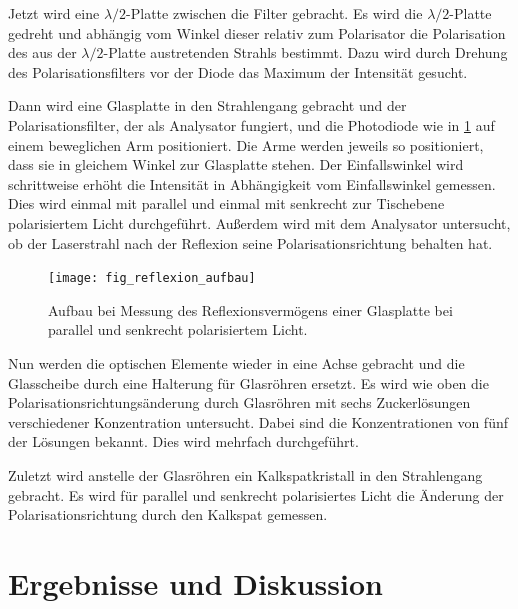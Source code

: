 \documentclass[
	a4paper,
	12pt,
	pagesize,
	ngerman
]{scrartcl}
\begin{document}
	Jetzt wird eine $\lambda /2$-Platte zwischen die Filter gebracht.
	Es wird die $\lambda /2$-Platte gedreht und abhängig vom Winkel dieser relativ zum Polarisator die Polarisation des aus der $\lambda /2$-Platte austretenden Strahls bestimmt.
	Dazu wird durch Drehung des Polarisationsfilters vor der Diode das Maximum der Intensität gesucht.
	
	Dann wird eine Glasplatte in den Strahlengang gebracht und der Polarisationsfilter, der als Analysator fungiert, und die Photodiode wie in \cref{fig_reflexion_aufbau} auf einem beweglichen Arm positioniert.
	Die Arme werden jeweils so positioniert, dass sie in gleichem Winkel zur Glasplatte stehen.
	Der Einfallswinkel wird schrittweise erhöht die Intensität in Abhängigkeit vom Einfallswinkel gemessen.
	Dies wird einmal mit parallel und einmal mit senkrecht zur Tischebene polarisiertem Licht durchgeführt.
	Außerdem wird mit dem Analysator untersucht, ob der Laserstrahl nach der Reflexion seine Polarisationsrichtung behalten hat.
	
	\begin{figure}[H] 
		\texttt{[image: fig\_reflexion\_aufbau]}
		\centering
		\caption{Aufbau bei Messung des Reflexionsvermögens einer Glasplatte bei parallel und senkrecht polarisiertem Licht. \cite{aufbau_reflexion}} 
		\label{fig_reflexion_aufbau}
		\centering
	\end{figure}
	
	Nun werden die optischen Elemente wieder in eine Achse gebracht und die Glasscheibe durch eine Halterung für Glasröhren ersetzt.
	Es wird wie oben die Polarisationsrichtungsänderung durch Glasröhren mit sechs Zuckerlösungen verschiedener Konzentration untersucht.
	Dabei sind die Konzentrationen von fünf der Lösungen bekannt.
	Dies wird mehrfach durchgeführt.
	
	Zuletzt wird anstelle der Glasröhren ein Kalkspatkristall in den Strahlengang gebracht.
	Es wird für parallel und senkrecht polarisiertes Licht die Änderung der Polarisationsrichtung durch den Kalkspat gemessen.
	
	\section{Ergebnisse und Diskussion}
	
\end{document}
